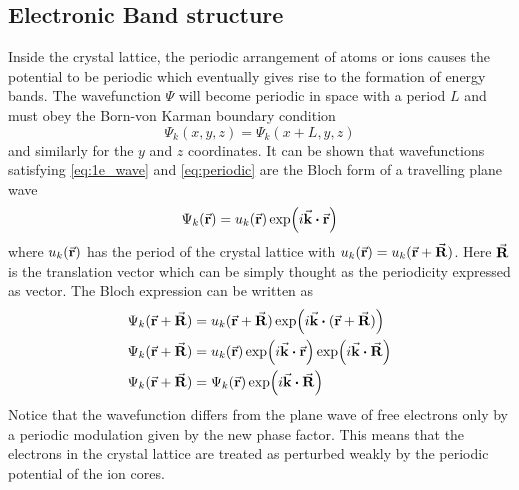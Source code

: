     \subsection{Electronic Band structure}
    Inside the crystal lattice, the periodic arrangement of atoms or ions causes the potential to be periodic which eventually gives rise to the formation of energy bands. The wavefunction $\Psi$ will become periodic in space with a period $L$ and must obey the Born-von Karman boundary condition 
\begin{equation} \label{eq:periodic}
    \Psi_k(x,y,z) = \Psi_k(x + L, y, z) 
\end{equation}
and similarly for the $y$ and $z$ coordinates. It can be shown that wavefunctions satisfying \eqref{eq:1e_wave} and \eqref{eq:periodic} are the Bloch form of a travelling plane wave
\begin{equation} \label{eq:Bloch}
    \Psi_k(\va{r}) = u_k(\va{r}) \exp(i \va{k} \vdot \va{r})
\end{equation}  
where $u_k(\va{r})$ has the period of the crystal lattice with $u_k(\va{r}) = u_k(\va{r} + \va{R})$. Here $\va{R}$ is the translation vector which can be simply thought as the periodicity expressed as vector.  The Bloch expression can be written as
\begin{align}
    \Psi_k(\va{r} + \va{R}) &= u_k(\va{r} + \va{R}) \exp(i \va{k} \vdot (\va{r} + \va{R}))  \notag \\
    \Psi_k(\va{r} + \va{R}) &= u_k(\va{r}) \exp(i \va{k} \vdot \va{r})  \exp(i \va{k} \vdot \va{R}) \notag \\
    \Psi_k(\va{r} + \va{R}) &= \Psi_k(\va{r}) \exp(i \va{k} \vdot \va{R}) 
\end{align}
Notice that the wavefunction differs from the plane wave of free electrons only by a periodic modulation given by the new phase factor. This means that the electrons in the crystal lattice are treated as perturbed weakly by the periodic potential of the ion cores.


